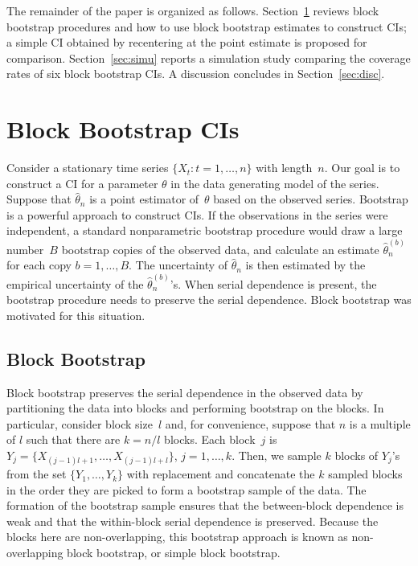 \documentclass[12pt, letterpaper, titlepage]{article}
\begin{document}
The remainder of the paper is organized as follows. Section~\ref{sec:bbci}
reviews block bootstrap procedures and how to use block bootstrap estimates to
construct CIs; a simple CI obtained by recentering at the point estimate is
proposed for comparison. Section~\ref{sec:simu} reports a simulation study
comparing the coverage rates of six block bootstrap CIs. A discussion
concludes in Section~\ref{sec:disc}.


\section{Block Bootstrap CIs}
\label{sec:bbci}


Consider a stationary time series $\{X_t: t = 1, \ldots, n\}$ with length~$n$.
Our goal is to construct a CI for a parameter $\theta$ in the data generating
model of the series. Suppose that $\hat\theta_n$ is a point estimator
of~$\theta$ based on the observed series. Bootstrap is a powerful approach to
construct CIs. If the observations in the series were independent, a standard
nonparametric bootstrap procedure would draw a large number~$B$ bootstrap
copies of the observed data, and calculate an estimate $\hat\theta_n^{(b)}$
for each copy $b = 1, \ldots, B$. The uncertainty of $\hat\theta_n$ is then
estimated by the empirical uncertainty of the $\hat\theta_n^{(b)}$'s. When
serial dependence is present, the bootstrap procedure needs to preserve the
serial dependence. Block bootstrap was motivated for this situation. 


\subsection{Block Bootstrap}


Block bootstrap preserves the serial dependence in the observed data by
partitioning the data into blocks and performing bootstrap on the blocks. In
particular, consider block size~$l$ and, for convenience, suppose that $n$ is
a multiple of $l$ such that there are $k = n / l$ blocks. Each block~$j$ is
$Y_j = \{X_{(j - 1) l + 1}, \ldots, X_{(j - 1) l + l}\}$, $j = 1, \ldots, k$.
Then, we sample $k$ blocks of $Y_j$'s from the set $\{Y_1, \ldots, Y_k\}$ with
replacement and concatenate the $k$ sampled blocks in the order they are
picked to form a bootstrap sample of the data. The formation of the bootstrap
sample ensures that the between-block dependence is weak and that the
within-block serial dependence is preserved. Because the blocks here are
non-overlapping, this bootstrap approach is known as non-overlapping block
bootstrap, or simple block bootstrap.
\end{document}
